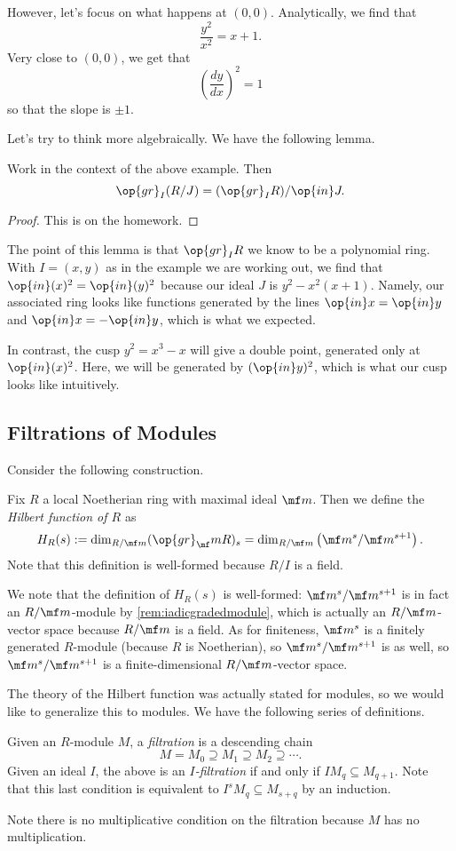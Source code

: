 However, let's focus on what happens at $(0,0)$. Analytically, we find that
\[\frac{y^2}{x^2}=x+1.\]
Very close to $(0,0)$, we get that
\[\left(\frac{dy}{dx}\right)^2=1\]
so that the slope is $\pm1$.

Let's try to think more algebraically. We have the following lemma.
\begin{lemma}
	Work in the context of the above example. Then
	\[\op{gr}_I(R/J)=(\op{gr}_IR)/\op{in}J.\]
\end{lemma}
\begin{proof}
	This is on the homework.
\end{proof}
The point of this lemma is that $\op{gr}_IR$ we know to be a polynomial ring. With $I=(x,y)$ as in the example we are working out, we find that $\op{in}(x)^2=\op{in}(y)^2$ because our ideal $J$ is $y^2-x^2(x+1)$. Namely, our associated ring looks like functions generated by the lines $\op{in}x=\op{in}y$ and $\op{in}x=-\op{in}y$, which is what we expected.

In contrast, the cusp $y^2=x^3-x$ will give a double point, generated only at $\op{in}(x)^2$. Here, we will be generated by $(\op{in}y)^2$, which is what our cusp looks like intuitively.

\subsection{Filtrations of Modules}
Consider the following construction.
\begin{defi} \label{def:hilbfuncring}
	Fix $R$ a local Noetherian ring with maximal ideal $\mf m$. Then we define the \textit{Hilbert function of $R$} as
	\[H_R(s):=\dim_{R/\mf m}(\op{gr}_\mf mR)_s=\dim_{R/\mf m}\left(\mf m^s/\mf m^{s+1}\right).\]
	Note that this definition is well-formed because $R/I$ is a field.
\end{defi}
We note that the definition of $H_R(s)$ is well-formed: $\mf m^s/\mf m^{s+1}$ is in fact an $R/\mf m$-module by \autoref{rem:iadicgradedmodule}, which is actually an $R/\mf m$-vector space because $R/\mf m$ is a field. As for finiteness, $\mf m^s$ is a finitely generated $R$-module (because $R$ is Noetherian), so $\mf m^s/\mf m^{s+1}$ is as well, so $\mf m^s/\mf m^{s+1}$ is a finite-dimensional $R/\mf m$-vector space.

The theory of the Hilbert function was actually stated for modules, so we would like to generalize this to modules. We have the following series of definitions.
\begin{definition}
	Given an $R$-module $M$, a \textit{filtration} is a descending chain
	\[M=M_0\supseteq M_1\supseteq M_2\supseteq\cdots.\]
	Given an ideal $I$, the above is an \textit{$I$-filtration} if and only if $IM_q\subseteq M_{q+1}$. Note that this last condition is equivalent to $I^sM_q\subseteq M_{s+q}$ by an induction.
\end{definition}
Note there is no multiplicative condition on the filtration because $M$ has no multiplication.

